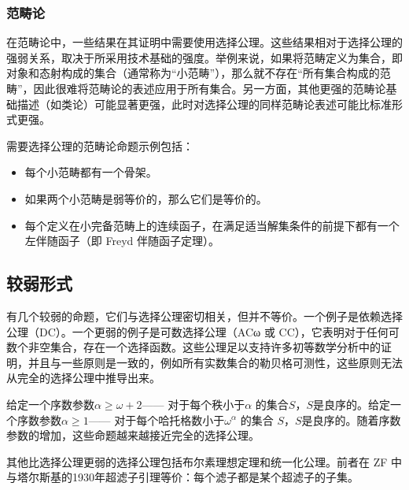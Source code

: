 \subsubsection{范畴论}  
在范畴论中，一些结果在其证明中需要使用选择公理。这些结果相对于选择公理的强弱关系，取决于所采用技术基础的强度。举例来说，如果将范畴定义为集合，即对象和态射构成的集合（通常称为“小范畴”），那么就不存在“所有集合构成的范畴”，因此很难将范畴论的表述应用于所有集合。另一方面，其他更强的范畴论基础描述（如类论）可能显著更强，此时对选择公理的同样范畴论表述可能比标准形式更强。

需要选择公理的范畴论命题示例包括：
\begin{itemize}
\item 每个小范畴都有一个骨架。  
\item 如果两个小范畴是弱等价的，那么它们是等价的。  
\item 每个定义在小完备范畴上的连续函子，在满足适当解集条件的前提下都有一个左伴随函子（即 Freyd 伴随函子定理）。
\end{itemize}
\subsection{较弱形式}  
有几个较弱的命题，它们与选择公理密切相关，但并不等价。一个例子是依赖选择公理（DC）。一个更弱的例子是可数选择公理（ACω 或 CC），它表明对于任何可数个非空集合，存在一个选择函数。这些公理足以支持许多初等数学分析中的证明，并且与一些原则是一致的，例如所有实数集合的勒贝格可测性，这些原则无法从完全的选择公理中推导出来。

给定一个序数参数\(\alpha \geq \omega + 2\)—— 对于每个秩小于\(\alpha\) 的集合\(S\)，\(S\)是良序的。给定一个序数参数\(\alpha \geq 1\)—— 对于每个哈托格数小于\(\omega^\alpha\) 的集合 \(S\)，\(S\)是良序的。随着序数参数的增加，这些命题越来越接近完全的选择公理。

其他比选择公理更弱的选择公理包括布尔素理想定理和统一化公理。前者在 ZF 中与塔尔斯基的1930年超滤子引理等价：每个滤子都是某个超滤子的子集。
